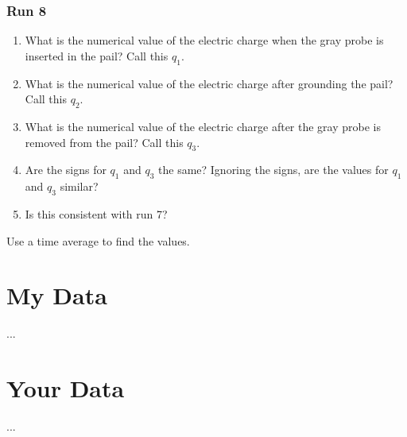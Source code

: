 \subsubsection{Run 8}
\begin{enumerate}
	\item What is the numerical value of the electric charge when the gray probe is inserted in the pail? Call this $q_{1}$.
	\item What is the numerical value of the electric charge after grounding the pail? Call this $q_{2}$.
	\item What is the numerical value of the electric charge after the gray probe is removed from the pail? Call this $q_{3}$.
	\item Are the signs for $q_{1}$ and $q_{3}$ the same? Ignoring the signs, are the values for $q_{1}$ and $q_{3}$ similar?
	\item Is this consistent with run 7?
\end{enumerate}
Use a time average to find the values.
\section{My Data}
...
\section{Your Data}
...
